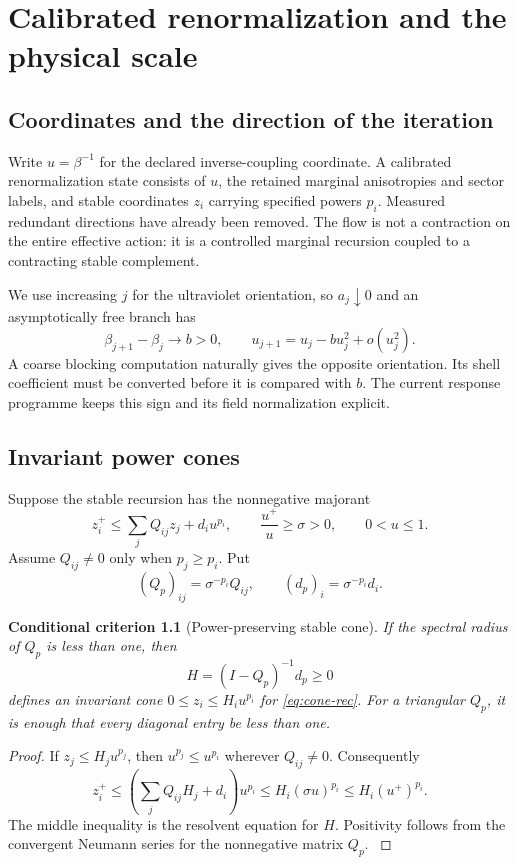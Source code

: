 \documentclass[11pt,oneside,openany]{book}
\newtheorem{criterion}[criterion]{Conditional criterion}
\theoremstyle{definition}
\theoremstyle{remark}
\newcommand{\src}[2]{\cite[#2]{#1}}
\begin{document}
\chapter{Calibrated renormalization and the physical scale}
\label{ch:rg}
\section{Coordinates and the direction of the iteration}
Write $u=\beta^{-1}$ for the declared inverse-coupling coordinate. A calibrated renormalization state consists of $u$, the retained marginal anisotropies and sector labels, and stable coordinates $z_i$ carrying specified powers $p_i$. Measured redundant directions have already been removed. The flow is not a contraction on the entire effective action: it is a controlled marginal recursion coupled to a contracting stable complement.

We use increasing $j$ for the ultraviolet orientation, so $a_j\downarrow0$ and an asymptotically free branch has
\[
\beta_{j+1}-\beta_j\longrightarrow b>0,
\qquad u_{j+1}=u_j-bu_j^2+o(u_j^2).
\]
A coarse blocking computation naturally gives the opposite orientation. Its shell coefficient must be converted before it is compared with $b$. The current response programme keeps this sign and its field normalization explicit.

\section{Invariant power cones}
Suppose the stable recursion has the nonnegative majorant
\begin{equation}\label{eq:cone-rec}
z_i^+\le\sum_jQ_{ij}z_j+d_i u^{p_i},
\qquad \frac{u^+}{u}\ge\sigma>0,
\qquad 0<u\le1.
\end{equation}
Assume $Q_{ij}\ne0$ only when $p_j\ge p_i$. Put
\[
(Q_p)_{ij}=\sigma^{-p_i}Q_{ij},\qquad
(d_p)_i=\sigma^{-p_i}d_i.
\]

\begin{criterion}[Power-preserving stable cone]\label{thm:cone}
If the spectral radius of $Q_p$ is less than one, then
\[
H=(I-Q_p)^{-1}d_p\ge0
\]
defines an invariant cone $0\le z_i\le H_i u^{p_i}$ for \cref{eq:cone-rec}. For a triangular $Q_p$, it is enough that every diagonal entry be less than one.
\end{criterion}
\begin{proof}
If $z_j\le H_ju^{p_j}$, then $u^{p_j}\le u^{p_i}$ wherever $Q_{ij}\ne0$. Consequently
\[
z_i^+\le\left(\sum_jQ_{ij}H_j+d_i\right)u^{p_i}
\le H_i(\sigma u)^{p_i}\le H_i(u^+)^{p_i}.
\]
The middle inequality is the resolvent equation for $H$. Positivity follows from the convergent Neumann series for the nonnegative matrix $Q_p$. \src{F9}{V12}
\end{proof}
\end{document}

